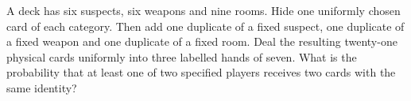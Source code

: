 A deck has six suspects, six weapons and nine rooms. Hide one uniformly chosen card of each category. Then add one duplicate of a fixed suspect, one duplicate of a fixed weapon and one duplicate of a fixed room. Deal the resulting twenty-one physical cards uniformly into three labelled hands of seven. What is the probability that at least one of two specified players receives two cards with the same identity?
